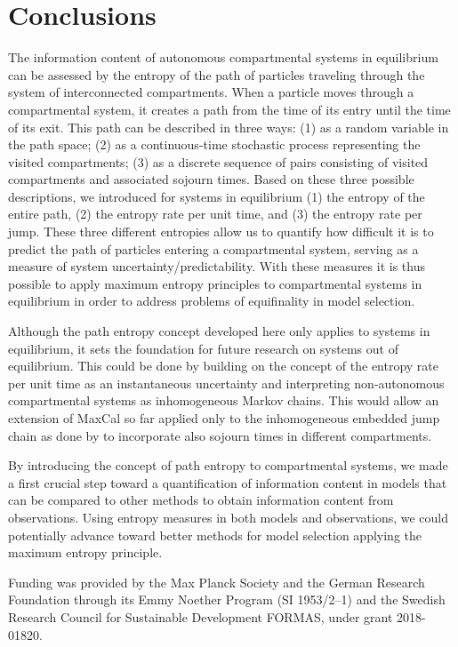 \documentclass[smallextended]{svjour3}
\begin{document}
\section{Conclusions}
The information content of autonomous compartmental systems in equilibrium can be assessed by the entropy of the path of particles traveling through the system of interconnected compartments. When a particle moves through a compartmental system, it creates a path from the time of its entry until the time of its exit. This path can be described in three ways: (1) as a random variable in the path space; (2) as a continuous-time stochastic process representing the visited compartments; (3) as a discrete sequence of pairs consisting of visited compartments and associated sojourn times. 
Based on these three possible descriptions, we introduced for systems in equilibrium (1) the entropy of the entire path, (2) the entropy rate per unit time, and (3) the entropy rate per jump. These three different entropies allow us to quantify how difficult it is to predict the path of particles entering a compartmental system, serving as a measure of system uncertainty/predictability. With these measures it is thus possible to apply maximum entropy principles to compartmental systems in equilibrium in order to address problems of equifinality in model selection. 

Although the path entropy concept developed here only applies to systems in equilibrium, it sets the foundation for future research on systems out of equilibrium. 
This could be done by building on the concept of the entropy rate per unit time as an instantaneous uncertainty and interpreting non-autonomous compartmental systems as inhomogeneous Markov chains.
This would allow an extension of MaxCal so far applied only to the inhomogeneous embedded jump chain as done by \citet{Ge2012JCP} to incorporate also sojourn times in different compartments.

By introducing the concept of path entropy to compartmental systems, we made a first crucial step toward a quantification of information content in models that can be compared to other methods to obtain information content from observations. Using entropy measures in both models and observations, we could potentially advance toward better methods for model selection applying the maximum entropy principle. 

\newpage

\begin{acknowledgements}
Funding was provided by the Max Planck Society and the German Research Foundation through its Emmy Noether Program (SI 1953/2--1) and the Swedish Research Council for Sustainable Development FORMAS, under grant 2018-01820.
\end{acknowledgements}
\end{document}
